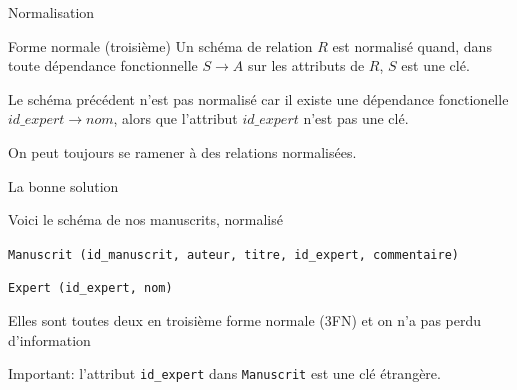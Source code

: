 \begin{frame}{Normalisation}
  
\begin{defblock}{Forme normale (troisième)}
  Un schéma de relation $R$ est \alert{normalisé} quand, dans
   toute dépendance fonctionnelle $S \to A$ sur
   les attributs de $R$, $S$ est une clé. 
\end{defblock}
 
\vfill

Le schéma précédent n'est pas normalisé car il existe une dépendance fonctionelle
$id\_expert \to nom$, alors que l'attribut
$id\_expert$ n'est pas une clé. 

\vfill

\begin{blocgauche}
On peut \alert{toujours} se ramener à des relations normalisées.
\end{blocgauche}

\end{frame}


\begin{frame}{La bonne solution}
 
Voici le schéma de nos manuscrits, \alert{normalisé} 
\vfill

\begin{redbullet}
  \item \texttt{Manuscrit (id\_manuscrit,  auteur, titre, id\_expert, commentaire)}
 \item \texttt{Expert (id\_expert, nom)}
\end{redbullet}

\vfill

Elles sont toutes deux en troisième forme normale (3FN)  \alert{et} on n'a pas perdu d'information

\vfill


\begin{blocgauche}
\alert{Important}:  l'attribut \texttt{id\_expert} dans \texttt{Manuscrit} est une \alert{clé étrangère}.
 \end{blocgauche}

\end{frame}


